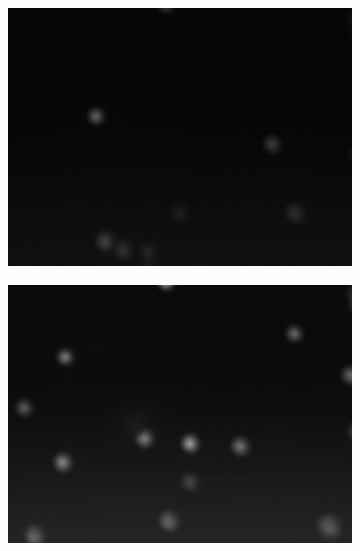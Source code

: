\documentclass[11pt,letterpaper]{article}
\begin{document}
\begin{figure}[H]
  \begin{subfigure}{0.3\textwidth}
      \centering
      \includegraphics[width=\textwidth]{essai_10um_2im_50ms.png}
      \caption{}
      \label{a}
  \end{subfigure}
  \hfill
  \begin{subfigure}{0.3\textwidth}
      \centering
      \includegraphics[width=\textwidth]{essai_10um_2im_100ms.png}
      \caption{}
      \label{b}
  \end{subfigure}
  \hfill
  \begin{subfigure}{0.3\textwidth}
    \centering

\end{subfigure}
\end{figure}
\end{document}
